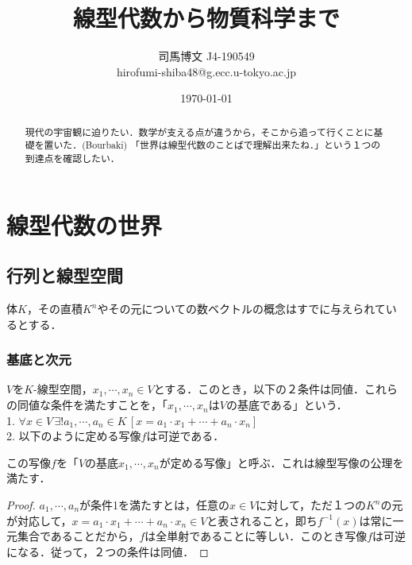 \documentclass[uplatex, 12pt, dvipdfmx]{jsreport}
\title{線型代数から物質科学まで}
\author{司馬博文 J4-190549\\hirofumi-shiba48@g.ecc.u-tokyo.ac.jp}
\date{\today}
\begin{document}
\maketitle
\begin{abstract}
    現代の宇宙観に迫りたい．数学が支える点が違うから，そこから追って行くことに基礎を置いた．(Bourbaki)
    「世界は線型代数のことばで理解出来たね．」という１つの到達点を確認したい．
\end{abstract}
\tableofcontents

\part{線型代数の世界}
\chapter{行列と線型空間}

体$K$，その直積$K^n$やその元についての数ベクトルの概念はすでに与えられているとする．

\section{基底と次元}

\begin{shadebox}\begin{definition}[基底]\rm{}
    $V$を$K$-線型空間，$x_1,\cdots,x_n\in V$とする．このとき，以下の２条件は同値．これらの同値な条件を満たすことを，「$x_1,\cdots,x_n$は$V$の基底である」という．\\
    1. $\forall x\in V \, \exists ! a_1,\cdots, a_n\in K \, [x=a_1\cdot x_1 +\cdots +a_n\cdot x_n]$\\
    2. 以下のように定める写像$f$は可逆である．
    \begin{center}\end{center}
    この写像$f$を「$V$の基底$x_1,\cdots,x_n$が定める写像」と呼ぶ．これは線型写像の公理を満たす．
\end{definition}\end{shadebox}

\begin{proof}
$a_1,\cdots,a_n$が条件1を満たすとは，任意の$x\in V$に対して，ただ１つの$K^n$の元が対応して，$x=a_1\cdot x_1 +\cdots +a_n\cdot x_n \in V$と表されること，即ち$f^{-1}(x)$は常に一元集合であることだから，$f$は全単射であることに等しい．このとき写像$f$は可逆になる．従って，２つの条件は同値．
\end{proof}
\end{document}

